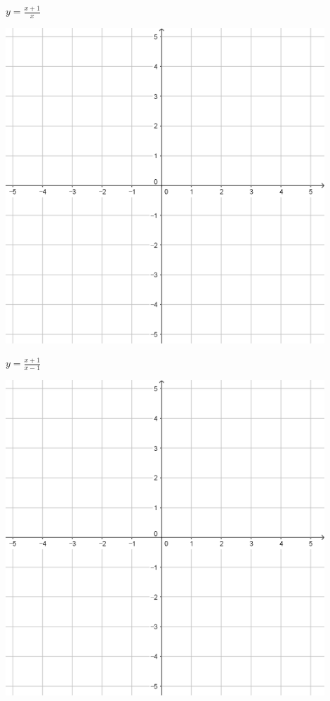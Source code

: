 \documentclass[a4paper]{oblivoir}
\begin{document}
\clearpage
\begin{minipage}{0.45\textwidth}\centering
\(y=\frac{x+1}{x}\)
\par\bigskip\includegraphics[width=0.9\textwidth]{55}
\end{minipage}
\begin{minipage}{0.45\textwidth}\centering
\(y=\frac{x+1}{x-1}\)
\par\bigskip\includegraphics[width=0.9\textwidth]{55}
\end{minipage}\bigskip\bigskip\par
\end{document}
